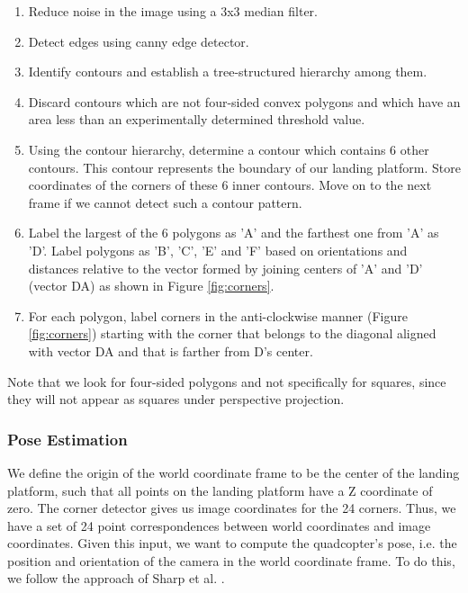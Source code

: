 \documentclass[10pt]{scrartcl} %
\begin{document}
\begin{enumerate}
\item{Reduce noise in the image using a 3x3 median filter.}
\item{Detect edges using canny edge detector.}
\item{Identify contours and establish a tree-structured hierarchy among them.}
\item{Discard contours which are not four-sided convex polygons and which have an area
	less than an experimentally determined threshold value.}
\item{Using the contour hierarchy, determine a contour which contains 6 other contours.
	This contour represents the boundary of our landing platform. Store coordinates of
	the corners of these 6 inner contours. Move on to the next frame if we cannot detect
	such a contour pattern.}
\item{Label the largest of the 6 polygons as 'A' and the farthest one from 'A' as 'D'.
	Label polygons as 'B', 'C', 'E' and 'F' based on orientations and distances relative
	to the vector formed by joining centers of 'A' and 'D' (vector DA) as shown in
	Figure \ref{fig:corners}.}
\item{For each polygon, label corners in the anti-clockwise manner (Figure \ref{fig:corners})
	starting with the corner that belongs to the diagonal aligned with vector DA and that is
	farther from D's center.}
\end{enumerate}

Note that we look for four-sided polygons and not specifically for squares, since they
will not appear as squares under perspective projection.

\subsubsection{Pose Estimation}

We define the origin of the world coordinate frame to be the center of the
landing platform, such that all points on the landing platform have a Z
coordinate of zero. The corner detector gives us image coordinates for the 24
corners. Thus, we have a set of 24 point correspondences between world
coordinates and image coordinates. Given this input, we want to compute the
quadcopter's pose, i.e. the position and orientation of the camera in the world
coordinate frame. To do this, we follow the approach of Sharp et al.
\cite{sharp_et_al_2001}.

\end{document}
